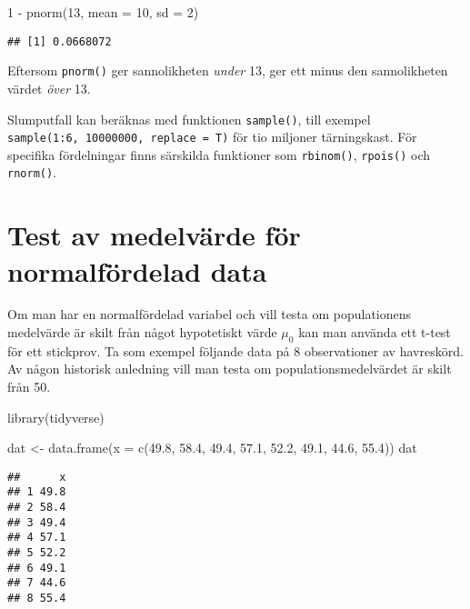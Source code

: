 \documentclass[
]{book}
\newenvironment{Shaded}{\begin{snugshade}}{\end{snugshade}}
\newcommand{\AttributeTok}[1]{\textcolor[rgb]{0.77,0.63,0.00}{#1}}
\newcommand{\DecValTok}[1]{\textcolor[rgb]{0.00,0.00,0.81}{#1}}
\newcommand{\FloatTok}[1]{\textcolor[rgb]{0.00,0.00,0.81}{#1}}
\newcommand{\FunctionTok}[1]{\textcolor[rgb]{0.00,0.00,0.00}{#1}}
\newcommand{\NormalTok}[1]{#1}
\newcommand{\OtherTok}[1]{\textcolor[rgb]{0.56,0.35,0.01}{#1}}
\newcommand{\SpecialCharTok}[1]{\textcolor[rgb]{0.00,0.00,0.00}{#1}}
\theoremstyle{definition}
\theoremstyle{definition}
\theoremstyle{definition}
\theoremstyle{definition}
\theoremstyle{remark}
\begin{document}
\begin{Shaded}
\begin{Highlighting}[]
\DecValTok{1} \SpecialCharTok{{-}} \FunctionTok{pnorm}\NormalTok{(}\DecValTok{13}\NormalTok{, }\AttributeTok{mean =} \DecValTok{10}\NormalTok{, }\AttributeTok{sd =} \DecValTok{2}\NormalTok{)}
\end{Highlighting}
\end{Shaded}

\begin{verbatim}
## [1] 0.0668072
\end{verbatim}

Eftersom \texttt{pnorm()} ger sannolikheten \emph{under} 13, ger ett minus den sannolikheten värdet \emph{över} 13.

Slumputfall kan beräknas med funktionen \texttt{sample()}, till exempel \texttt{sample(1:6,\ 10000000,\ replace\ =\ T)} för tio miljoner tärningskast. För specifika fördelningar finns särskilda funktioner som \texttt{rbinom()}, \texttt{rpois()} och \texttt{rnorm()}.

\hypertarget{test-av-medelvuxe4rde-fuxf6r-normalfuxf6rdelad-data}{%
\section{Test av medelvärde för normalfördelad data}\label{test-av-medelvuxe4rde-fuxf6r-normalfuxf6rdelad-data}}

Om man har en normalfördelad variabel och vill testa om populationens medelvärde är skilt från något hypotetiskt värde \(\mu_0\) kan man använda ett t-test för ett stickprov. Ta som exempel följande data på 8 observationer av havreskörd. Av någon historisk anledning vill man testa om populationsmedelvärdet är skilt från 50.

\begin{Shaded}
\begin{Highlighting}[]
\FunctionTok{library}\NormalTok{(tidyverse)}

\NormalTok{dat }\OtherTok{\textless{}{-}} \FunctionTok{data.frame}\NormalTok{(}\AttributeTok{x =} \FunctionTok{c}\NormalTok{(}\FloatTok{49.8}\NormalTok{, }\FloatTok{58.4}\NormalTok{, }\FloatTok{49.4}\NormalTok{, }\FloatTok{57.1}\NormalTok{, }\FloatTok{52.2}\NormalTok{, }\FloatTok{49.1}\NormalTok{, }\FloatTok{44.6}\NormalTok{, }\FloatTok{55.4}\NormalTok{))}
\NormalTok{dat}
\end{Highlighting}
\end{Shaded}

\begin{verbatim}
##      x
## 1 49.8
## 2 58.4
## 3 49.4
## 4 57.1
## 5 52.2
## 6 49.1
## 7 44.6
## 8 55.4
\end{verbatim}
\end{document}
